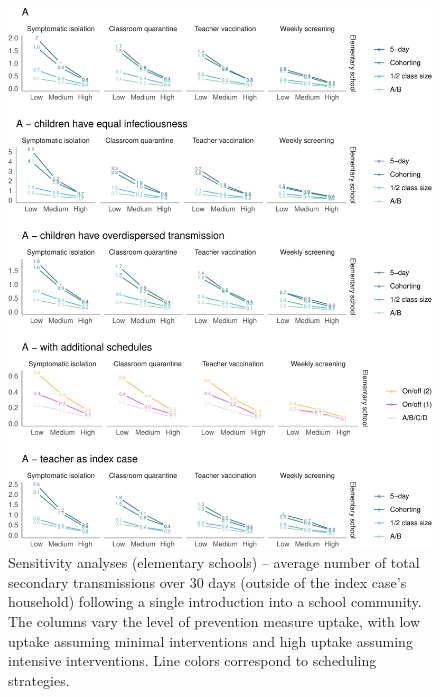 \documentclass[
]{article}
\begin{document}
\begin{figure}
\centering
\includegraphics{Schools_draft_files/figure-latex/figs3-1.pdf}
\caption{\label{figs1} Sensitivity analyses (elementary schools) --
average number of total secondary transmissions over 30 days (outside of
the index case's household) following a single introduction into a
school community. The columns vary the level of prevention measure
uptake, with low uptake assuming minimal interventions and high uptake
assuming intensive interventions. Line colors correspond to scheduling
strategies.}
\end{figure}
\end{document}
